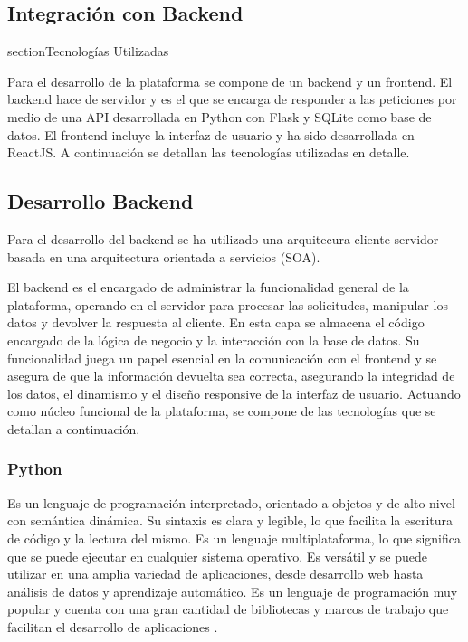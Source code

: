 \subsection{Integración con Backend}

section{Tecnologías Utilizadas}

Para el desarrollo de la plataforma se compone de un backend y un frontend. El backend hace de servidor y es el que se encarga de responder a las peticiones por medio de una API desarrollada en Python con Flask y SQLite como base de datos. El frontend incluye la interfaz de usuario y ha sido desarrollada en ReactJS. A continuación se detallan las tecnologías utilizadas en detalle.

\subsection{Desarrollo Backend}

Para el desarrollo del backend se ha utilizado una arquitecura cliente-servidor basada en una arquitectura orientada a servicios (SOA).\newline

El backend es el encargado de administrar la funcionalidad general de la plataforma, operando en el servidor para procesar las solicitudes, manipular los datos y devolver la respuesta al cliente. En esta capa se almacena el código encargado de la lógica de negocio y la interacción con la base de datos. Su funcionalidad juega un papel esencial en la comunicación con el frontend y se asegura de que la información devuelta sea correcta, asegurando la integridad de los datos, el dinamismo y el diseño responsive de la interfaz de usuario. Actuando como núcleo funcional de la plataforma, se compone de las tecnologías que se detallan a continuación.

\subsubsection*{Python}
Es un lenguaje de programación interpretado, orientado a objetos y de alto nivel con semántica dinámica. Su sintaxis es clara y legible, lo que facilita la escritura de código y la lectura del mismo. Es un lenguaje multiplataforma, lo que significa que se puede ejecutar en cualquier sistema operativo. Es versátil y se puede utilizar en una amplia variedad de aplicaciones, desde desarrollo web hasta análisis de datos y aprendizaje automático. Es un lenguaje de programación muy popular y cuenta con una gran cantidad de bibliotecas y marcos de trabajo que facilitan el desarrollo de aplicaciones \cite{python2021python}.\newline

